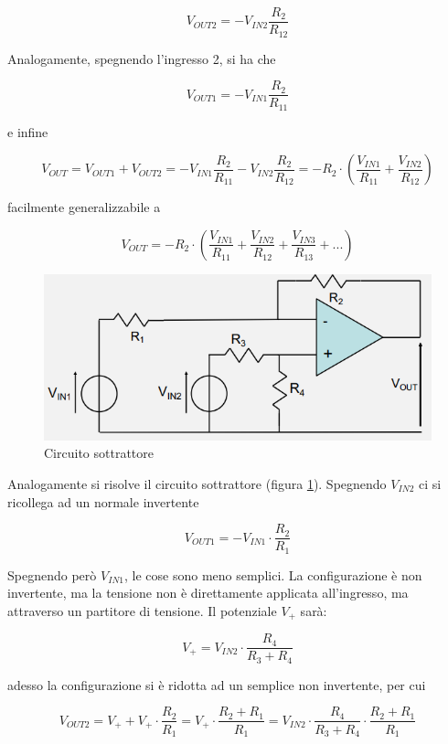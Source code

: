 \documentclass{article}
\begin{document}
\[V_{OUT2} = - V_{IN2} \frac{R_2}{R_{12}}\]

Analogamente, spegnendo l'ingresso 2, si ha che

\[V_{OUT1} = - V_{IN1} \frac{R_2}{R_{11}}\]

e infine

\[V_{OUT} = V_{OUT1} + V_{OUT2} = - V_{IN1} \frac{R_2}{R_{11}} - V_{IN2} \frac{R_2}{R_{12}} = - R_2 \cdot \left( \frac{V_{IN1}}{R_{11}} + \frac{V_{IN2}}{R_{12}} \right)\]

facilmente generalizzabile a 

\[V_{OUT} = - R_2 \cdot \left( \frac{V_{IN1}}{R_{11}} + \frac{V_{IN2}}{R_{12}} + \frac{V_{IN3}}{R_{13}} + ... \right)\]

\clearpage
\begin{figure}[h]
  \centering
  \includegraphics[scale=0.7]{IM_circuito_sottrattore}
  \caption{Circuito sottrattore}
  \label{Schema_circuito_sottrattore}
\end{figure}

Analogamente si risolve il circuito sottrattore (figura \ref{Schema_circuito_sottrattore}). Spegnendo $V_{IN2}$ ci si ricollega ad un normale invertente

\[V_{OUT1} = - V_{IN1} \cdot \frac{R_2}{R_1}\]

Spegnendo però $V_{IN1}$, le cose sono meno semplici. La configurazione è non invertente, ma la tensione non è direttamente applicata all'ingresso, ma attraverso un partitore di tensione. Il potenziale $V_+$ sarà:

\[V_+ = V_{IN2} \cdot \frac{R_4}{R_3 + R_4}\]

adesso la configurazione si è ridotta ad un semplice non invertente, per cui

\[V_{OUT2} = V_+ + V_+ \cdot \frac{R_2}{R_1} = V_+ \cdot \frac{R_2 + R_1}{R_1} = V_{IN2} \cdot \frac{R_4}{R_3 + R_4} \cdot \frac{R_2 + R_1}{R_1}\]
\end{document}
